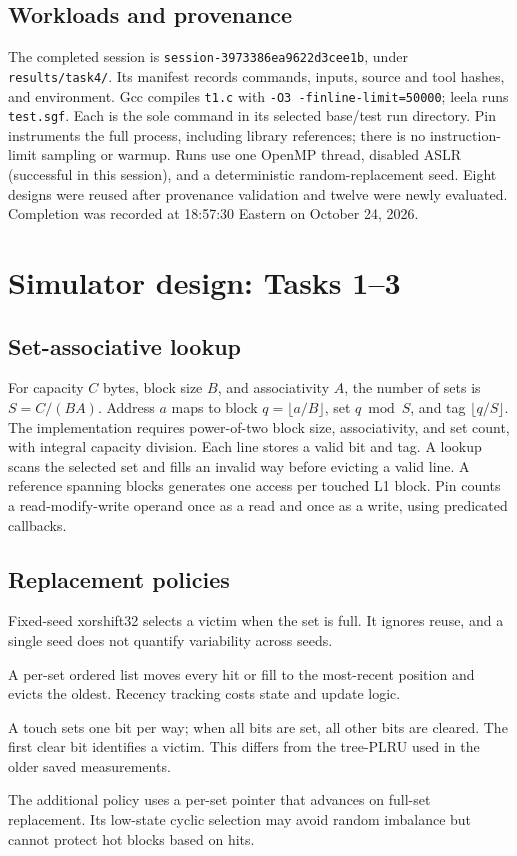 \documentclass[10pt,letterpaper]{article}
\begin{document}
\subsection*{Workloads and provenance}
The completed session is \texttt{session-3973386ea9622d3cee1b}, under
\texttt{results/task4/}. Its manifest records commands, inputs, source and tool
hashes, and environment. Gcc compiles \texttt{t1.c} with
\texttt{-O3 -finline-limit=50000}; leela runs \texttt{test.sgf}. Each is the sole
command in its selected base/test run directory. Pin instruments the full
process, including library references; there is no instruction-limit sampling
or warmup. Runs use one OpenMP thread, disabled ASLR (successful in this session),
and a deterministic random-replacement seed. Eight designs were reused after
provenance validation and twelve were newly evaluated. Completion was recorded
at 18:57:30 Eastern on October 24, 2026.

\clearpage
\section{Simulator design: Tasks 1--3}
\subsection{Set-associative lookup}
For capacity $C$ bytes, block size $B$, and associativity $A$, the number of sets
is $S=C/(BA)$. Address $a$ maps to block $q=\lfloor a/B\rfloor$, set $q\bmod S$,
and tag $\lfloor q/S\rfloor$. The implementation requires power-of-two block
size, associativity, and set count, with integral capacity division. Each line
stores a valid bit and tag. A lookup scans the selected set and fills an invalid
way before evicting a valid line. A reference spanning blocks generates one
access per touched L1 block. Pin counts a read-modify-write operand once as a
read and once as a write, using predicated callbacks.
\subsection{Replacement policies}
\begin{description}[style=nextline]
\item[Random.] Fixed-seed xorshift32 selects a victim when the set is full. It
ignores reuse, and a single seed does not quantify variability across seeds.
\item[LRU.] A per-set ordered list moves every hit or fill to the most-recent
position and evicts the oldest. Recency tracking costs state and update logic.
\item[Bit-PLRU.] A touch sets one bit per way; when all bits are set, all other
bits are cleared. The first clear bit identifies a victim. This differs from
the tree-PLRU used in the older saved measurements.
\item[Round-robin.] The additional policy uses a per-set pointer that advances
on full-set replacement. Its low-state cyclic selection may avoid random
imbalance but cannot protect hot blocks based on hits.
\end{description}
\end{document}
